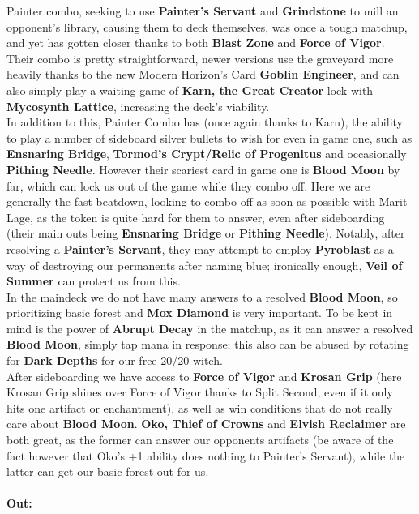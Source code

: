 \documentclass{report}
\begin{document}
Painter combo, seeking to use \textbf{Painter's Servant} and \textbf{Grindstone} to mill an opponent's library, causing them to deck themselves, was once a tough matchup, and yet has gotten closer thanks to both \textbf{Blast Zone} and \textbf{Force of Vigor}. Their combo is pretty straightforward, newer versions use the graveyard more heavily thanks to the new Modern Horizon's Card \textbf{Goblin Engineer}, and can also simply play a waiting game of \textbf{Karn, the Great Creator} lock with \textbf{Mycosynth Lattice}, increasing the deck's viability.\\ In addition to this, Painter Combo has (once again thanks to Karn), the ability to play a number of sideboard silver bullets to wish for even in game one, such as \textbf{Ensnaring Bridge}, \textbf{Tormod's Crypt/Relic of Progenitus} and occasionally \textbf{Pithing Needle}. However their scariest card in game one is \textbf{Blood Moon} by far, which can lock us out of the game while they combo off. Here we are generally the fast beatdown, looking to combo off as soon as possible with Marit Lage, as the token is quite hard for them to answer, even after sideboarding (their main outs being \textbf{Ensnaring Bridge} or \textbf{Pithing Needle}). Notably, after resolving a \textbf{Painter's Servant}, they may attempt to employ \textbf{Pyroblast} as a way of destroying our permanents after naming blue; ironically enough, \textbf{Veil of Summer} can protect us from this.\\ In the maindeck we do not have many answers to a resolved \textbf{Blood Moon}, so prioritizing basic forest and \textbf{Mox Diamond} is very important. To be kept in mind is the power of \textbf{Abrupt Decay} in the matchup, as it can answer a resolved \textbf{Blood Moon}, simply tap mana in response; this also can be abused by rotating for \textbf{Dark Depths} for our free 20/20 witch.\\
After sideboarding we have access to \textbf{Force of Vigor} and \textbf{Krosan Grip} (here Krosan Grip shines over Force of Vigor thanks to Split Second, even if it only hits one artifact or enchantment), as well as win conditions that do not really care about \textbf{Blood Moon}. \textbf{Oko, Thief of Crowns} and \textbf{Elvish Reclaimer} are both great, as the former can answer our opponents artifacts (be aware of the fact however that Oko's +1 ability does nothing to Painter's Servant), while the latter can get our basic forest out for us.\\\\
\textbf{Out:}\\
\end{document}
